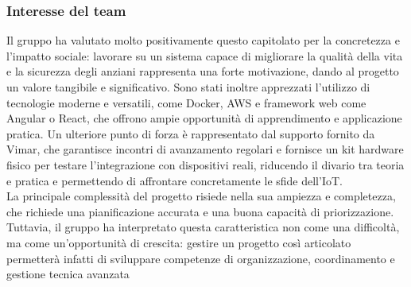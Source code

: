 \documentclass[a4paper,11pt]{article}
\begin{document}
\subsubsection{Interesse del team}
\parbox[t]{\linewidth}{%
Il gruppo ha valutato molto positivamente questo capitolato per la concretezza e
l'impatto sociale: lavorare su un sistema capace di migliorare la qualità della vita e
la sicurezza degli anziani rappresenta una forte motivazione, dando al progetto un
valore tangibile e significativo. Sono stati inoltre apprezzati l'utilizzo di tecnologie
moderne e versatili, come Docker, AWS e framework web come Angular o React,
che offrono ampie opportunità di apprendimento e applicazione pratica. Un
ulteriore punto di forza è rappresentato dal supporto fornito da Vimar, che
garantisce incontri di avanzamento regolari e fornisce un kit hardware fisico per
testare l'integrazione con dispositivi reali, riducendo il divario tra teoria e pratica e
permettendo di affrontare concretamente le sfide dell'IoT.
\\
La principale complessità del progetto risiede nella sua ampiezza e completezza,
che richiede una pianificazione accurata e una buona capacità di priorizzazione.
Tuttavia, il gruppo ha interpretato questa caratteristica non come una difficoltà, ma
come un'opportunità di crescita: gestire un progetto così articolato permetterà
infatti di sviluppare competenze di organizzazione, coordinamento e gestione
tecnica avanzata
}
\end{document}
